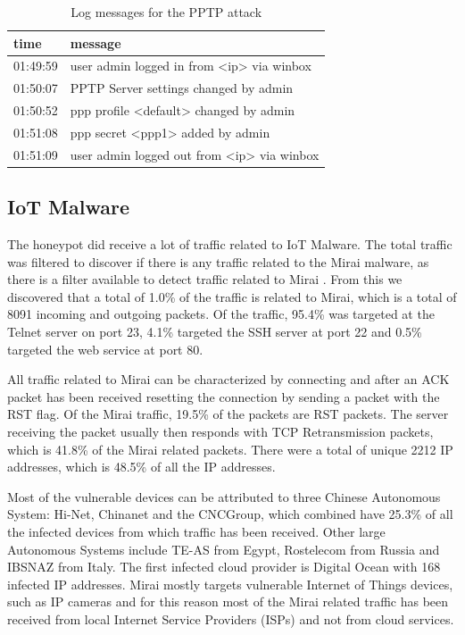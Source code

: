 \begin{table}[h]
\centering
\begin{tabular}{ |l|l| } 
\hline
time & message \\ \hline
01:49:59 & user admin logged in from <ip> via winbox \\ \hline
01:50:07 & PPTP Server settings changed by admin \\ \hline
01:50:52 & ppp profile <default> changed by admin \\ \hline
01:51:08 & ppp secret <ppp1> added by admin \\ \hline
01:51:09 & user admin logged out from <ip> via winbox \\ \hline
\end{tabular}
\caption{Log messages for the PPTP attack}
\label{table:pptp_attack_log}
\end{table}

\subsection{IoT Malware}
The honeypot did receive a lot of traffic related to IoT Malware. The total traffic was filtered to discover if there is any traffic related to the Mirai malware, as there is a filter available to detect traffic related to Mirai \cite{IMPROVINGIOTBOTNET:SENSORS:2018}. From this we discovered that a total of 1.0\% of the traffic is related to Mirai, which is a total of 8091 incoming and outgoing packets. Of the traffic, 95.4\% was targeted at the Telnet server on port 23, 4.1\% targeted the SSH server at port 22 and 0.5\% targeted the web service at port 80.

All traffic related to Mirai can be characterized by connecting and after an ACK packet has been received resetting the connection by sending a packet with the RST flag. Of the Mirai traffic, 19.5\% of the packets are RST packets. The server receiving the packet usually then responds with TCP Retransmission packets, which is 41.8\% of the Mirai related packets. There were a total of unique 2212 IP addresses, which is 48.5\% of all the IP addresses.

Most of the vulnerable devices can be attributed to three Chinese Autonomous System: Hi-Net, Chinanet and the CNCGroup, which combined have 25.3\% of all the infected devices from which traffic has been received. Other large Autonomous Systems include TE-AS from Egypt, Rostelecom from Russia and IBSNAZ from Italy. The first infected cloud provider is Digital Ocean with 168 infected IP addresses. Mirai mostly targets vulnerable Internet of Things devices, such as IP cameras \cite{UNDERSTANDINGMIRAI:USENIX:2017} and for this reason most of the Mirai related traffic has been received from local Internet Service Providers (ISPs) and not from cloud services.


